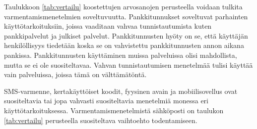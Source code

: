 Taulukkoon \ref{tab:vertailu} koostettujen arvosanojen perusteella voidaan tulkita varmentamismenetelmien soveltuvuutta. Pankkitunnukset soveltuvat parhainten käyttötarkoituksiin, joissa vaaditaan vahvaa tunnistautumista kuten pankkipalvelut ja julkiset palvelut. Pankkitunnusten hyöty on se, että käyttäjän henkilöllisyys tiedetään koska se on vahvistettu pankkitunnusten annon aikana pankissa. Pankkitunnusten käyttäminen muissa palveluissa olisi mahdollista, mutta se ei ole suositeltavaa. Vahvan tunnistautumisen menetelmää tulisi käyttää vain palveluissa, joissa tämä on välttämätöntä. 
 
SMS-varmenne, kertakäyttöiset koodit, fyysinen avain ja mobiilisovellus ovat suositeltavia tai jopa vahvasti suositeltavia menetelmiä monessa eri käyttötarkoituksessa. Varmentamismenetelmistä sähköposti on taulukon \ref{tab:vertailu} perusteella suositeltava vaihtoehto todentamiseen.
